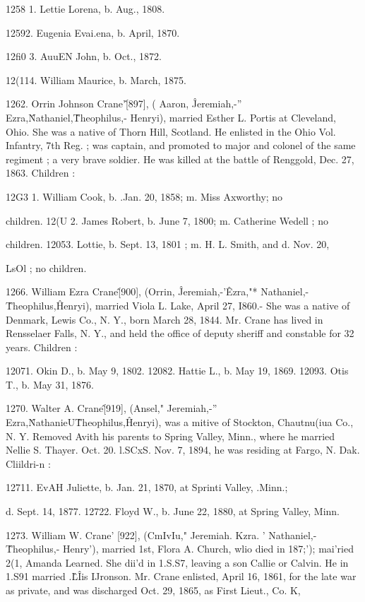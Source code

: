 1258  1. Lettie Lorena, b. Aug., 1808. 

12592. Eugenia Evai.ena, b. April, 1870. 

12fi0 3. AuuEN John, b. Oct., 1872. 

12(114. William Maurice, b. March, 1875. 

1262. Orrin Johnson Crane'\^ [897], ( Aaron, \^ Jeremiah,-'' 
Ezra,\^ Nathaniel,\^ Theophilus,- Henryi), married Esther L. 
Portis at Cleveland, Ohio. She was a native of Thorn Hill, 
Scotland. He enlisted in the Ohio Vol. Infantry, 7th Reg. ; was 
captain, and promoted to major and colonel of the same regiment ; 
a very brave soldier. He was killed at the battle of Renggold, 
Dec. 27, 1863. Children : 

12G3  1. William Cook, b. .Jan. 20, 1858; m. Miss Axworthy; no 

children. 
12(U 2. James Robert, b. June 7, 1800; m. Catherine Wedell ; no 

children. 
12053. Lottie, b. Sept. 13, 1801 ; m. H. L. Smith, and d. Nov. 20, 

LsOl ; no children. 

1266. William Ezra Crane\^ [900], (Orrin, \^ Jeremiah,-'\^ 
Ezra,"* Nathaniel,-\^ Theophilus,\^ Henryi), married Viola L. Lake, 
April 27, I860.- She was a native of Denmark, Lewis Co., N. 
Y., born March 28, 1844. Mr. Crane has lived in Rensselaer 
Falls, N. Y., and held the office of deputy sheriff and constable 
for 32 years. Children : 

12071. Okin D., b. May 9, 1802. 
12082. Hattie L., b. May 19, 1869. 
12093. Otis T., b. May 31, 1876. 

1270. Walter A. Crane\^ [919], (Ansel," Jeremiah,-'' Ezra,\^ 
NathanieU\^ Theophilus,\^ Henryi), was a mitive of Stockton, 
Chautnu(iua Co., N. Y. Removed Avith his parents to Spring 
Valley, Minn., where he married Nellie S. Thayer. Oct. 20. l.SCxS. 
Nov. 7, 1894, he was residing at Fargo, N. Dak. Cliildri-n : 

12711. EvAH Juliette, b. Jan. 21, 1870, at Sprinti Valley, .Minn.; 

d. Sept. 14, 1877. 
12722. Floyd W., b. June 22, 1880, at Spring Valley, Minn. 

1273. William W. Crane' [922], (CmIvIu," Jeremiah.  Kzra. ' 
Nathaniel,-\^ Theophilus,- Henry'), married 1st, Flora A. Church, 
wlio died in 187;'); mai'ried 2(1, Amanda Learned. She dii'd in 
1.S.S7, leaving a son Callie or Calvin. He in 1.S91 married .\^L\^Iis 
IJronson. Mr. Crane enlisted, April 16, 1861, for the late war as 
private, and was discharged Oct. 29, 1865, as First Lieut., Co. K, 




